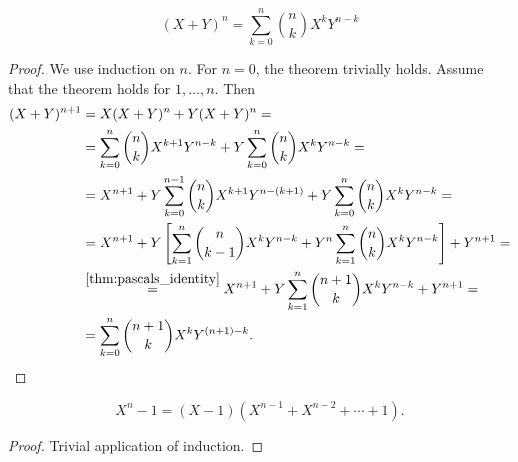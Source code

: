 \begin{theorem}\label{thm:binomial_theorem}
  \begin{equation*}
    (X + Y)^n = \sum_{k=0}^n \binom n k X^k Y^{n-k}
  \end{equation*}
\end{theorem}
\begin{proof}
  We use induction on \( n \). For \( n = 0 \), the theorem trivially holds. Assume that the theorem holds for \( 1, \ldots, n \). Then
  \begin{align*}
    (X + Y)^{n+1}
    &=
    X (X + Y)^n + Y (X + Y)^n
    = \\ &=
    \sum_{k=0}^n \binom n k X^{k+1} Y^{n-k} + Y \sum_{k=0}^n \binom n k X^k Y^{n-k}
    = \\ &=
    X^{n+1} + Y \sum_{k=0}^{n-1} \binom n k X^{k+1} Y^{n-(k+1)} + Y \sum_{k=0}^n \binom n k X^k Y^{n-k}
    = \\ &=
    X^{n+1} + Y \left[ \sum_{k=1}^n \binom n {k-1} X^k Y^{n-k} + Y^n \sum_{k=1}^n \binom n k X^k Y^{n-k} \right] + Y^{n+1}
    = \\ &\overset {\ref{thm:pascals_identity}} =
    X^{n+1} + Y \sum_{k=1}^n \binom {n+1} k X^k Y^{n-k} + Y^{n+1}
    = \\ &=
    \sum_{k=0}^n \binom {n+1} k X^k Y^{(n+1)-k}.
  \end{align*}
\end{proof}

\begin{proposition}\label{thm:xn_minus_one_factorization}
  \begin{equation*}
    X^n - 1 = (X - 1)(X^{n-1} + X^{n-2} + \cdots + 1).
  \end{equation*}
\end{proposition}
\begin{proof}
  Trivial application of induction.
\end{proof}

